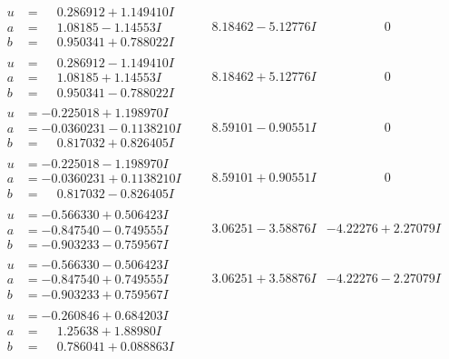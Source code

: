 \documentclass[1p]{elsarticle_modified}
\theoremstyle{definition}
\begin{document}
$$\begin{array}{c|c|c}
\begin{aligned}
u &= \phantom{-}0.286912 + 1.149410 I \\
a &= \phantom{-}1.08185 - 1.14553 I \\
b &= \phantom{-}0.950341 + 0.788022 I\end{aligned}
 & \phantom{-}8.18462 - 5.12776 I & \phantom{-0.000000 } 0 \\ \hline\begin{aligned}
u &= \phantom{-}0.286912 - 1.149410 I \\
a &= \phantom{-}1.08185 + 1.14553 I \\
b &= \phantom{-}0.950341 - 0.788022 I\end{aligned}
 & \phantom{-}8.18462 + 5.12776 I & \phantom{-0.000000 } 0 \\ \hline\begin{aligned}
u &= -0.225018 + 1.198970 I \\
a &= -0.0360231 - 0.1138210 I \\
b &= \phantom{-}0.817032 + 0.826405 I\end{aligned}
 & \phantom{-}8.59101 - 0.90551 I & \phantom{-0.000000 } 0 \\ \hline\begin{aligned}
u &= -0.225018 - 1.198970 I \\
a &= -0.0360231 + 0.1138210 I \\
b &= \phantom{-}0.817032 - 0.826405 I\end{aligned}
 & \phantom{-}8.59101 + 0.90551 I & \phantom{-0.000000 } 0 \\ \hline\begin{aligned}
u &= -0.566330 + 0.506423 I \\
a &= -0.847540 - 0.749555 I \\
b &= -0.903233 - 0.759567 I\end{aligned}
 & \phantom{-}3.06251 - 3.58876 I & -4.22276 + 2.27079 I \\ \hline\begin{aligned}
u &= -0.566330 - 0.506423 I \\
a &= -0.847540 + 0.749555 I \\
b &= -0.903233 + 0.759567 I\end{aligned}
 & \phantom{-}3.06251 + 3.58876 I & -4.22276 - 2.27079 I \\ \hline\begin{aligned}
u &= -0.260846 + 0.684203 I \\
a &= \phantom{-}1.25638 + 1.88980 I \\
b &= \phantom{-}0.786041 + 0.088863 I\end{aligned}

\end{array}$$
\end{document}
